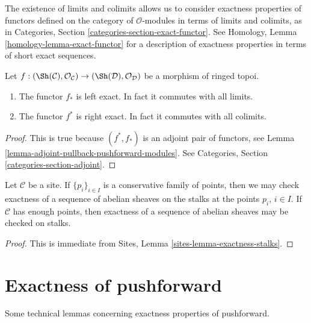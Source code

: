 \noindent
The existence of limits and colimits allows us to consider exactness
properties of functors defined on the category of $\mathcal{O}$-modules
in terms of limits and colimits, as in
Categories, Section \ref{categories-section-exact-functor}.
See Homology, Lemma \ref{homology-lemma-exact-functor} for a description of
exactness properties in terms of short exact sequences.

\begin{lemma}
\label{lemma-exactness-pushforward-pullback}
Let $f : (\Sh(\mathcal{C}), \mathcal{O}_\mathcal{C})
\to (\Sh(\mathcal{D}), \mathcal{O}_\mathcal{D})$
be a morphism of ringed topoi.
\begin{enumerate}
\item The functor $f_*$ is left exact. In fact it commutes with
all limits.
\item The functor $f^*$ is right exact. In fact it commutes
with all colimits.
\end{enumerate}
\end{lemma}

\begin{proof}
This is true because $(f^*, f_*)$ is an adjoint pair
of functors, see
Lemma \ref{lemma-adjoint-pullback-pushforward-modules}.
See Categories, Section \ref{categories-section-adjoint}.
\end{proof}

\begin{lemma}
\label{lemma-check-exactness-stalks}
Let $\mathcal{C}$ be a site. If $\{p_i\}_{i \in I}$ is a conservative
family of points, then we may check exactness of a sequence of abelian
sheaves on the stalks at the points $p_i$, $i \in I$.
If $\mathcal{C}$ has enough points, then
exactness of a sequence of abelian sheaves may
be checked on stalks.
\end{lemma}

\begin{proof}
This is immediate from
Sites, Lemma \ref{sites-lemma-exactness-stalks}.
\end{proof}





\section{Exactness of pushforward}
\label{section-pushforward}

\noindent
Some technical lemmas concerning exactness properties of pushforward.

